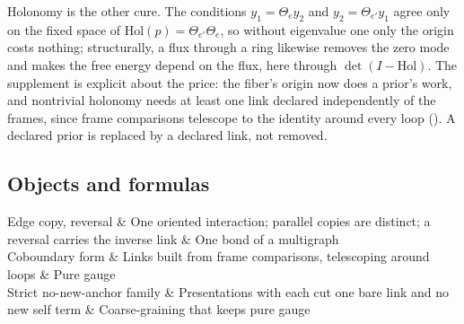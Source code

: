 Holonomy is the other cure. The conditions \(y_1=\Theta_ey_2\) and \(y_2=\Theta_{e'}y_1\) agree only on the fixed space of
\(\mathrm{Hol}(p)=\Theta_{e'}\Theta_e\), so without eigenvalue one only the origin costs nothing; structurally, a flux through
a ring likewise removes the zero mode and makes the free energy depend on the flux, here through
\(\det(I-\mathrm{Hol})\). The supplement is
explicit about the price: the fiber's origin now does a prior's work, and nontrivial holonomy needs at least one link
declared independently of the frames, since frame comparisons telescope to the identity around every loop
(). A declared prior is replaced by a declared link, not removed.

\subsection{Objects and formulas}

\begin{decoder}
Edge copy, reversal & One oriented interaction; parallel copies are distinct; a reversal carries the inverse link & One bond of a multigraph\\
Coboundary form & Links built from frame comparisons, telescoping around loops & Pure gauge\\
Strict no-new-anchor family & Presentations with each cut one bare link and no new self term & Coarse-graining that keeps pure gauge\\
\end{decoder}

